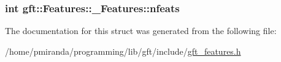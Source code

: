 \subsubsection[{\texorpdfstring{nfeats}{nfeats}}]{\setlength{\rightskip}{0pt plus 5cm}int gft\+::\+Features\+::\+\_\+\+Features\+::nfeats}\hypertarget{structgft_1_1Features_1_1__Features_a12c316ab4f8e2888f20ebd037f93d83c}{}\label{structgft_1_1Features_1_1__Features_a12c316ab4f8e2888f20ebd037f93d83c}


The documentation for this struct was generated from the following file\+:\begin{DoxyCompactItemize}
\item 
/home/pmiranda/programming/lib/gft/include/\hyperlink{gft__features_8h}{gft\+\_\+features.\+h}\end{DoxyCompactItemize}
